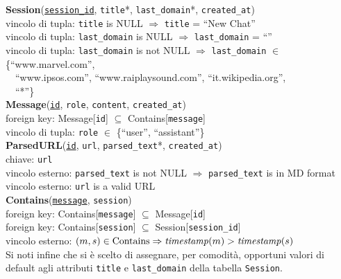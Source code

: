 \indent
\textbf{Session}(\underline{\texttt{session\_id}}, \texttt{title}*, \texttt{last\_domain}*, \texttt{created\_at})\\
\indent\indent vincolo di tupla: \texttt{title} is NULL $\Rightarrow $ \texttt{title} = ``New Chat''\\
\indent\indent vincolo di tupla: \texttt{last\_domain} is NULL $\Rightarrow$ \texttt{last\_domain} = ``''\\
\indent\indent vincolo di tupla: \texttt{last\_domain} is not NULL $\Rightarrow$ \texttt{last\_domain} $\in$ \{``www.marvel.com'',\\ 
\indent\indent\indent\indent\indent\indent\,\,\,\, ``www.ipsos.com'', ``www.raiplaysound.com'', ``it.wikipedia.org'',\\
\indent\indent\indent\indent\indent\indent\,\,\,\, ``*''\}\\
\indent
\textbf{Message}(\underline{\texttt{id}}, \texttt{role}, \texttt{content}, \texttt{created\_at})\\
\indent\indent foreign key: Message[\texttt{id}] $\subseteq$ Contains[\texttt{message}]\\
\indent\indent vincolo di tupla: \texttt{role} $\in$ \{``user'', ``assistant''\}\\
\indent
\textbf{ParsedURL}(\underline{\texttt{id}}, \texttt{url}, \texttt{parsed\_text}*, \texttt{created\_at})\\
\indent\indent chiave: \texttt{url}\\
\indent\indent vincolo esterno: \texttt{parsed\_text} is not NULL $\Rightarrow$ \texttt{parsed\_text} is in MD format\\
\indent\indent vincolo esterno: \texttt{url} is a valid URL\\ 
\indent
\textbf{Contains}(\underline{\texttt{message}}, \texttt{session})\\
\indent\indent foreign key: Contains[\texttt{message}] $\subseteq$ Message[\texttt{id}]\\
\indent\indent foreign key: Contains[\texttt{session}] $\subseteq$ Session[\texttt{session\_id}]\\
\indent\indent vincolo esterno: $(m, s) \in \text{Contains} \Rightarrow \text{\textit{timestamp}}(m) > \text{\textit{timestamp}}(s)$\\

Si noti infine che si è scelto di assegnare, per comodità, opportuni valori di default agli attributi \texttt{title} e \texttt{last\_domain} della tabella \texttt{Session}.

